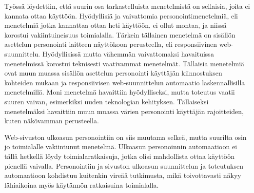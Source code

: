 \documentclass[finnish, 12pt, a4paper, elec, utf8, a-1b, online]{aaltothesis}
\begin{document}
Työssä löydettiin, että suurin osa tarkastelluista menetelmistä on sellaisia,
joita ei kannata ottaa käyttöön. Hyödyllisiä ja vaivattomia
personointimenetelmiä, eli menetelmiä jotka kannattaa ottaa heti käyttöön, ei
ollut montaa, ja niissä korostui vakiintuineisuus toimialalla. Tärkein tällainen
menetelmä on sisällön asettelun personointi laitteen näyttökoon perusteella, eli
responsiivinen web-suunnittelu. Hyödyllisissä mutta vähemmän vaivattomaksi
havaituissa menetelmissä korostui teknisesti vaativammat menetelmät. Tällaisia
menetelmiä ovat muun muassa sisällön asettelun personointi käyttäjän kiinnostuksen
kohteiden mukaan ja responsiivisen web-suunnittelun automaatio laskennallisilla
menetelmillä. Moni menetelmä havaittiin hyödylliseksi, mutta toteutus vaatii
suuren vaivan, esimerkiksi uuden teknologian kehityksen. Tällaiseksi
menetelmäksi havaittiin muun muassa värien personointi käyttäjän rajoitteiden,
kuten näkövamman perusteella.

Web-sivuston ulkoasun personointiin on siis muutama selkeä, mutta suurilta osin
jo toimialalle vakiintunut menetelmä. Ulkoasun personoinnin automaatioon ei
tällä hetkellä löydy toimialaratkaisuja, jotka olisi mahdollista ottaa käyttöön
pienellä vaivalla. Personointiin ja sivuston ulkoasun suunnittelun ja
toteutuksen automaatioon kohdistuu kuitenkin vireää tutkimusta, mikä
toivottavasti näkyy lähiaikoina myös käytännön ratkaisuina toimialalla.

\clearpage

\thesisbibliography{}
\printbibliography{}
\end{document}
